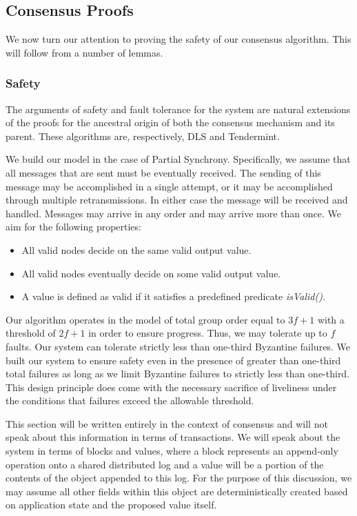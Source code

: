 \subsection{Consensus Proofs}

We now turn our attention to proving the safety of our consensus
algorithm.
This will follow from a number of lemmas.


\subsubsection{Safety}

The arguments of safety and fault tolerance for the system are natural
extensions of the proofs for the ancestral origin of both the consensus
mechanism and its parent.
These algorithms are, respectively, DLS and Tendermint.

We build our model in the case of Partial Synchrony.
Specifically, we assume that all messages that are sent must be
eventually received.
The sending of this message may be accomplished in a single attempt, or
it may be accomplished through multiple retransmissions.
In either case the message will be received and handled.
Messages may arrive in any order and may arrive more than once.
We aim for the following properties:

\begin{itemize}
	\item All valid nodes decide on the same valid output value.
	\item All valid nodes eventually decide on some valid output value.
	\item A value is defined as valid if it satisfies a predefined
    predicate \textit{isValid()}.
\end{itemize}

Our algorithm operates in the model of total group order equal to $3f+1$
with a threshold of $2f+1$ in order to ensure progress.
Thus, we may tolerate up to $f$ faults.
Our system can tolerate strictly less than one-third Byzantine failures.
We built our system to ensure safety even in the presence of greater
than one-third total failures as long as we limit Byzantine failures to
strictly less than one-third.
This design principle does come with the necessary sacrifice of
liveliness under the conditions that failures exceed the allowable
threshold.

This section will be written entirely in the context of consensus and
will not speak about this information in terms of transactions.
We will speak about the system in terms of blocks and values, where a
block represents an append-only operation onto a shared distributed log
and a value will be a portion of the contents of the object appended to
this log.
For the purpose of this discussion, we may assume all other fields
within this object are deterministically created based on application
state and the proposed value itself.


